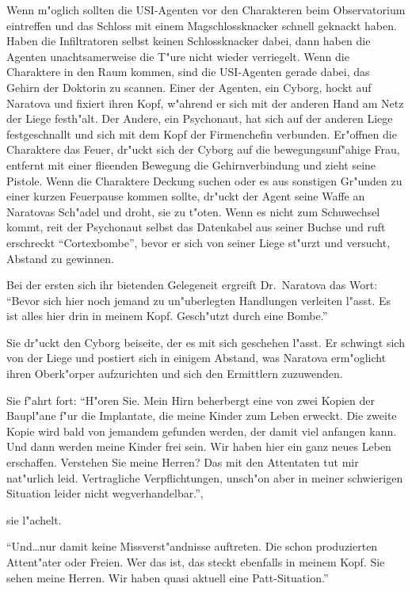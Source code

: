Wenn m"oglich sollten die USI-Agenten vor den Charakteren beim Observatorium eintreffen und das Schloss mit einem Magschlossknacker schnell geknackt haben. Haben die Infiltratoren selbst keinen Schlossknacker dabei, dann haben die Agenten unachtsamerweise die T"ure nicht wieder verriegelt. Wenn die Charaktere in den Raum kommen, sind die USI-Agenten gerade dabei, das Gehirn der Doktorin zu scannen. Einer der Agenten, ein Cyborg, hockt auf Naratova und fixiert ihren Kopf, w"ahrend er sich mit der anderen Hand am Netz der Liege festh"alt. Der Andere, ein Psychonaut, hat sich auf der anderen Liege festgeschnallt und sich mit dem Kopf der Firmenchefin verbunden. Er"offnen die Charaktere das Feuer, dr"uckt sich der Cyborg auf die bewegungsunf"ahige Frau, entfernt mit einer flie\3enden Bewegung die Gehirnverbindung und zieht seine Pistole. Wenn die Charaktere Deckung suchen oder es aus sonstigen Gr"unden zu einer kurzen Feuerpause kommen sollte, dr"uckt der Agent seine Waffe an Naratovas Sch"adel und droht, sie zu t"oten. Wenn es nicht zum Schu\3wechsel kommt, rei\3t der Psychonaut selbst das Datenkabel aus seiner Buchse und ruft erschreckt "`Cortexbombe"', bevor er sich von seiner Liege st"urzt und versucht, Abstand zu gewinnen.

Bei der ersten sich ihr bietenden Gelegeneit ergreift Dr.~Naratova das Wort: "`Bevor sich hier noch jemand zu un"uberlegten Handlungen verleiten l"asst. Es ist alles hier drin in meinem Kopf. Gesch"utzt durch eine Bombe."'

Sie dr"uckt den Cyborg beiseite, der es mit sich geschehen l"asst. Er schwingt sich von der Liege und postiert sich in einigem Abstand, was Naratova erm"oglicht ihren Oberk"orper aufzurichten und sich den Ermittlern zuzuwenden.

Sie f"ahrt fort: "`H"oren Sie. Mein Hirn beherbergt eine von zwei Kopien der Baupl"ane f"ur die Implantate, die meine Kinder zum Leben erweckt. Die zweite Kopie wird bald von jemandem gefunden werden, der damit viel anfangen kann. Und dann werden meine Kinder frei sein. Wir haben hier ein ganz neues Leben erschaffen. Verstehen Sie meine Herren? Das mit den Attentaten tut mir nat"urlich leid. Vertragliche Verpflichtungen, unsch"on aber in meiner schwierigen Situation leider nicht wegverhandelbar."',

sie l"achelt.

"`Und\dots{}nur damit keine Missverst"andnisse auftreten. Die schon produzierten Attent"ater oder Freien. Wer das ist, das steckt ebenfalls in meinem Kopf. Sie sehen meine Herren. Wir haben quasi aktuell eine Patt-Situation."'

